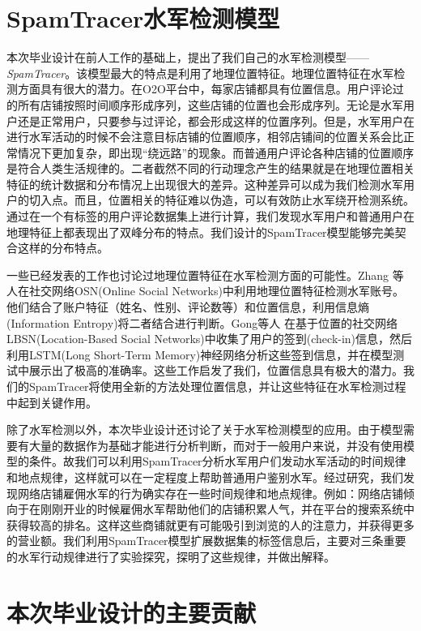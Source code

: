 \section{SpamTracer水军检测模型}

本次毕业设计在前人工作的基础上，提出了我们自己的水军检测模型——\emph{SpamTracer}。该模型最大的特点是利用了地理位置特征。地理位置特征在水军检测方面具有很大的潜力。在O2O平台中，每家店铺都具有位置信息。用户评论过的所有店铺按照时间顺序形成序列，这些店铺的位置也会形成序列。无论是水军用户还是正常用户，只要参与过评论，都会形成这样的位置序列。但是，水军用户在进行水军活动的时候不会注意目标店铺的位置顺序，相邻店铺间的位置关系会比正常情况下更加复杂，即出现“绕远路”的现象。而普通用户评论各种店铺的位置顺序是符合人类生活规律的。二者截然不同的行动理念产生的结果就是在地理位置相关特征的统计数据和分布情况上出现很大的差异。这种差异可以成为我们检测水军用户的切入点。而且，位置相关的特征难以伪造，可以有效防止水军绕开检测系统。通过在一个有标签的用户评论数据集上进行计算，我们发现水军用户和普通用户在地理特征上都表现出了双峰分布的特点。我们设计的SpamTracer模型能够完美契合这样的分布特点。

一些已经发表的工作也讨论过地理位置特征在水军检测方面的可能性。Zhang \parencite{Zhang:2014}等人在社交网络OSN(Online Social Networks)中利用地理位置特征检测水军账号。他们结合了账户特征（姓名、性别、评论数等）和位置信息，利用信息熵(Information Entropy)将二者结合进行判断。Gong等人 \parencite{Gong:2018}在基于位置的社交网络LBSN(Location-Based Social Networks)中收集了用户的签到(check-in)信息，然后利用LSTM(Long Short-Term Memory)神经网络分析这些签到信息，并在模型测试中展示出了极高的准确率。这些工作启发了我们，位置信息具有极大的潜力。我们的SpamTracer将使用全新的方法处理位置信息，并让这些特征在水军检测过程中起到关键作用。

除了水军检测以外，本次毕业设计还讨论了关于水军检测模型的应用。由于模型需要有大量的数据作为基础才能进行分析判断，而对于一般用户来说，并没有使用模型的条件。故我们可以利用SpamTracer分析水军用户们发动水军活动的时间规律和地点规律，这样就可以在一定程度上帮助普通用户鉴别水军。经过研究，我们发现网络店铺雇佣水军的行为确实存在一些时间规律和地点规律。例如：网络店铺倾向于在刚刚开业的时候雇佣水军帮助他们的店铺积累人气，并在平台的搜索系统中获得较高的排名。这样这些商铺就更有可能吸引到浏览的人的注意力，并获得更多的营业额。我们利用SpamTracer模型扩展数据集的标签信息后，主要对三条重要的水军行动规律进行了实验探究，探明了这些规律，并做出解释。


\section{本次毕业设计的主要贡献}

